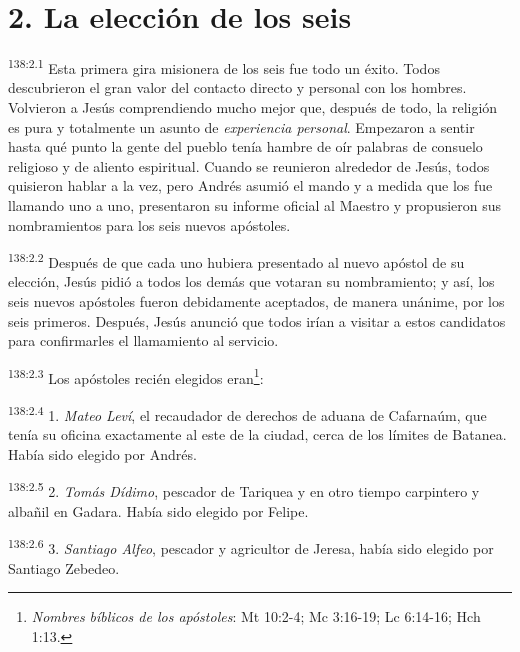 \section*{2. La elección de los seis}
\par
\textsuperscript{138:2.1} Esta primera gira misionera de los seis fue todo un éxito. Todos descubrieron el gran valor del contacto directo y personal con los hombres. Volvieron a Jesús comprendiendo mucho mejor que, después de todo, la religión es pura y totalmente un asunto de \textit{experiencia personal}. Empezaron a sentir hasta qué punto la gente del pueblo tenía hambre de oír palabras de consuelo religioso y de aliento espiritual. Cuando se reunieron alrededor de Jesús, todos quisieron hablar a la vez, pero Andrés asumió el mando y a medida que los fue llamando uno a uno, presentaron su informe oficial al Maestro y propusieron sus nombramientos para los seis nuevos apóstoles.

\par
\textsuperscript{138:2.2} Después de que cada uno hubiera presentado al nuevo apóstol de su elección, Jesús pidió a todos los demás que votaran su nombramiento; y así, los seis nuevos apóstoles fueron debidamente aceptados, de manera unánime, por los seis primeros. Después, Jesús anunció que todos irían a visitar a estos candidatos para confirmarles el llamamiento al servicio.

\par
\textsuperscript{138:2.3} Los apóstoles recién elegidos eran\footnote{\textit{Nombres bíblicos de los apóstoles}: Mt 10:2-4; Mc 3:16-19; Lc 6:14-16; Hch 1:13.}:

\par
\textsuperscript{138:2.4} 1. \textit{Mateo Leví}, el recaudador de derechos de aduana de Cafarnaúm, que tenía su oficina exactamente al este de la ciudad, cerca de los límites de Batanea. Había sido elegido por Andrés.

\par
\textsuperscript{138:2.5} 2. \textit{Tomás Dídimo}, pescador de Tariquea y en otro tiempo carpintero y albañil en Gadara. Había sido elegido por Felipe.

\par
\textsuperscript{138:2.6} 3. \textit{Santiago Alfeo}, pescador y agricultor de Jeresa, había sido elegido por Santiago Zebedeo.

